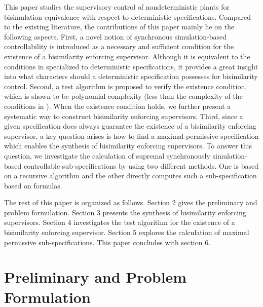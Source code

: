 \documentclass[preprint,authoryear,12pt]{elsarticle}
\begin{document}
This paper studies the supervisory control of nondeterministic
plants for bisimulation equivalence with respect to deterministic
specifications. Compared to the existing literature, the
contributions of this paper mainly lie on the following aspects.
First, a novel notion of synchronous simulation-based
controllability is introduced as a necessary and sufficient
condition for the existence of a bisimilarity enforcing
supervisor. Although it is equivalent to the conditions in
\citep{zhoubisimilarity2011} specialized to deterministic
specifications, it provides a great insight into what characters
should a deterministic specification possesses for bisimilarity
control. Second, a test algorithm is proposed to verify the
existence condition, which is shown to be polynomial complexity
(less than the complexity of the conditions in
\citep{zhoubisimilarity2011}). When the existence condition holds,
we further present a systematic way to construct bisimilarity
enforcing supervisors. Third, since a given specification does
always guarantee the existence of a bisimilarity enforcing
supervisor, a key question arises is how to find a maximal
permissive specification which enables the synthesis of
bisimilarity enforcing supervisors. To answer this question, we
investigate the calculation of supremal synchronously
simulation-based controllable sub-specifications by using two
different methods. One is based on a recursive algorithm and the
other directly computes such a sub-specification based on
formulas.








The rest of this paper is organized as follows. Section 2 gives
the preliminary and problem formulation. Section 3 presents the
synthesis of bisimilarity enforcing supervisors. Section 4
investigates the test algorithm for the existence of a
bisimilarity enforcing supervisor. Section 5 explores the
calculation of maximal permissive sub-specifications. This paper
concludes with section 6.


\section{Preliminary and Problem Formulation}
\end{document}
